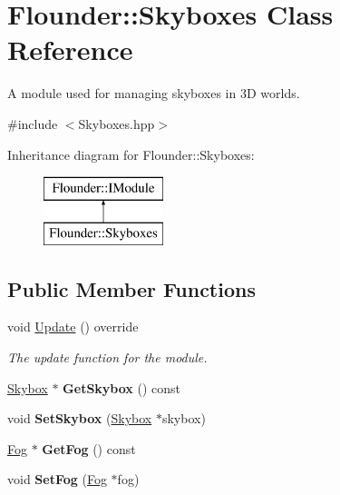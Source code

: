 \hypertarget{class_flounder_1_1_skyboxes}{}\section{Flounder\+:\+:Skyboxes Class Reference}
\label{class_flounder_1_1_skyboxes}


A module used for managing skyboxes in 3D worlds.  




{\ttfamily \#include $<$Skyboxes.\+hpp$>$}

Inheritance diagram for Flounder\+:\+:Skyboxes\+:\begin{figure}[H]
\begin{center}
\leavevmode
\includegraphics[height=2.000000cm]{class_flounder_1_1_skyboxes}
\end{center}
\end{figure}
\subsection*{Public Member Functions}
\begin{DoxyCompactItemize}
\item 
void \hyperlink{class_flounder_1_1_skyboxes_a74932667f6a24ce9518d01e4f6a26351}{Update} () override
\begin{DoxyCompactList}\small\item\em The update function for the module. \end{DoxyCompactList}\item 
\mbox{\label{class_flounder_1_1_skyboxes_a66307748fc701202cb8f759608c7a562}} 
\hyperlink{class_flounder_1_1_skybox}{Skybox} $\ast$ {\bfseries Get\+Skybox} () const
\item 
\mbox{\label{class_flounder_1_1_skyboxes_aa7754a7b5bc44582e7e67d57800e2643}} 
void {\bfseries Set\+Skybox} (\hyperlink{class_flounder_1_1_skybox}{Skybox} $\ast$skybox)
\item 
\mbox{\label{class_flounder_1_1_skyboxes_af4403808b92cf691a97db9c89bd78e2e}} 
\hyperlink{class_flounder_1_1_fog}{Fog} $\ast$ {\bfseries Get\+Fog} () const
\item 
\mbox{\label{class_flounder_1_1_skyboxes_a49b870d9ea3c58609734f400ef3c354a}} 
void {\bfseries Set\+Fog} (\hyperlink{class_flounder_1_1_fog}{Fog} $\ast$fog)
\end{DoxyCompactItemize}
